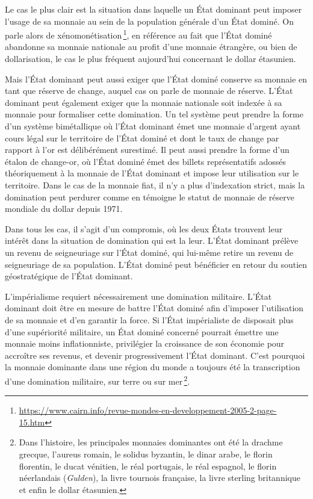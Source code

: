 \documentclass[a4paper,notitlepage]{article}
\newcommand{\eng}[1]{{\NoAutoSpaceBeforeFDP\emph{#1}}}  %
\newcommand{\sfootnote}{\,\footnote}
\begin{document}
Le cas le plus clair est la situation dans laquelle un État dominant peut imposer l'usage de sa monnaie au sein de la population générale d'un État dominé. On parle alors de xénomonétisation\sfootnote{\url{https://www.cairn.info/revue-mondes-en-developpement-2005-2-page-15.htm}}, en référence au fait que l'État dominé abandonne sa monnaie nationale au profit d'une monnaie étrangère, ou bien de dollarisation, le cas le plus fréquent aujourd'hui concernant le dollar étasunien.

Mais l'État dominant peut aussi exiger que l'État dominé conserve sa monnaie en tant que réserve de change, auquel cas on parle de monnaie de réserve. L'État dominant peut également exiger que la monnaie nationale soit indexée à sa monnaie pour formaliser cette domination. Un tel système peut prendre la forme d'un système bimétallique où l'État dominant émet une monnaie d'argent ayant cours légal sur le territoire de l'État dominé et dont le taux de change par rapport à l'or est délibérément surestimé. Il peut aussi prendre la forme d'un étalon de change-or, où l'État dominé émet des billets représentatifs adossés théoriquement à la monnaie de l'État dominant et impose leur utilisation sur le territoire. Dans le cas de la monnaie fiat, il n'y a plus d'indexation strict, mais la domination peut perdurer comme en témoigne le statut de monnaie de réserve mondiale du dollar depuis 1971.

Dans tous les cas, il s'agit d'un compromis, où les deux États trouvent leur intérêt dans la situation de domination qui est la leur. L'État dominant prélève un revenu de seigneuriage sur l'État dominé, qui lui-même retire un revenu de seigneuriage de sa population. L'État dominé peut bénéficier en retour du soutien géostratégique de l'État dominant.

L'impérialisme requiert nécessairement une domination militaire. L'État dominant doit être en mesure de battre l'État dominé afin d'imposer l'utilisation de sa monnaie et d'en garantir la force. Si l'État impérialiste de disposait plus d'une supériorité militaire, un État dominé concerné pourrait émettre une monnaie moins inflationniste, privilégier la croissance de son économie pour accroître ses revenus, et devenir progressivement l'État dominant. C'est pourquoi la monnaie dominante dans une région du monde a toujours été la transcription d'une domination militaire, sur terre ou sur mer\sfootnote{Dans l'histoire, les principales monnaies dominantes ont été la drachme grecque, l'aureus romain, le solidus byzantin, le dinar arabe, le florin florentin, le ducat vénitien, le réal portugais, le réal espagnol, le florin néerlandais (\eng{Gulden}), la livre tournois française, la livre sterling britannique et enfin le dollar étasunien.}.
\end{document}
